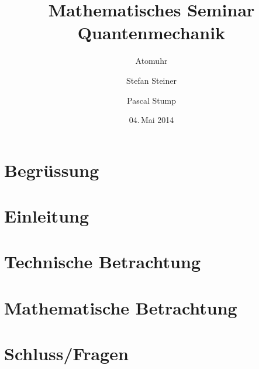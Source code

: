 \documentclass[compressd]
              {beamer}
\title[MathSem QM]{Mathematisches Seminar Quantenmechanik}
\subtitle{Atomuhr}
\author{Stefan Steiner \and Pascal Stump}
\institute{HSR Hochschule für Technik Rapperswil}
\date{04.\,Mai 2014}
\begin{document}
\begin{frame}
  \titlepage
\end{frame}

\section{Begrüssung}


\section{Einleitung}


\section[Tech]{Technische Betrachtung}
 

\section[Math]{Mathematische Betrachtung}


\section[?]{ Schluss/Fragen}


\end{document}
